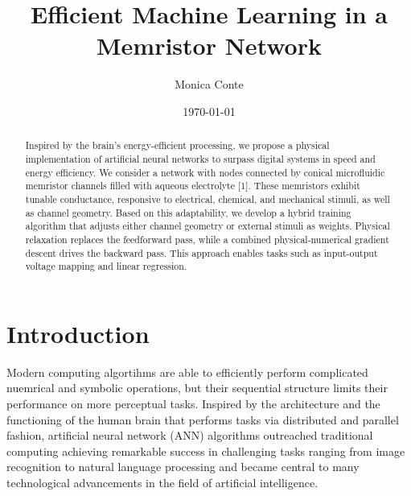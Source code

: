\documentclass[reprint,superscriptaddress,prb,showkeys]{revtex4-2}
\begin{document}
\title{Efficient Machine Learning in a Memristor Network}

\author{Monica Conte}

\date{\today}

\begin{abstract}
Inspired by the brain's energy-efficient processing, we propose a physical implementation of artificial neural networks to surpass digital systems in speed and energy efficiency. We consider a network with nodes connected by conical microfluidic memristor channels filled with aqueous electrolyte [1]. These memristors exhibit tunable conductance, responsive to electrical, chemical, and mechanical stimuli, as well as channel geometry. Based on this adaptability, we develop a hybrid training algorithm that adjusts either channel geometry or external stimuli as weights. Physical relaxation replaces the feedforward pass, while a combined physical-numerical gradient descent drives the backward pass. This approach enables tasks such as input-output voltage mapping and linear regression.
\end{abstract}
\maketitle

\renewcommand{\figurename}{FIG.}

\section{\label{sec:Intro}Introduction}


Modern computing algortihms are able to efficiently perform complicated nuemrical and symbolic operations, but their sequential structure limits their performance on more perceptual tasks. Inspired by the architecture and the functioning of the human brain that performs tasks via distributed and parallel fashion, artificial neural network (ANN) algorithms outreached traditional computing achieving remarkable success in challenging tasks ranging from image recognition to natural language processing and became central to many technological advancements in the field of artificial intelligence.
\end{document}
